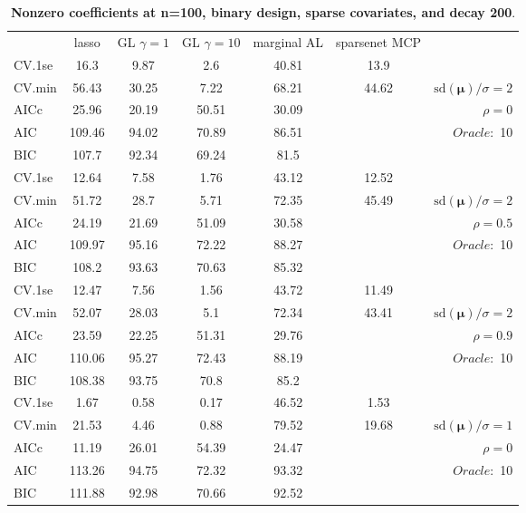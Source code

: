 \clearpage
\begin{table}\vspace{-.5cm}
\caption[l]{ { \bf Nonzero coefficients at n=100, binary design, 
sparse covariates, and  decay  200}.}
\vspace{-.5cm}
\footnotesize{}
\begin{center}
\begin{tabular}{l*{5}{c}|r}
& lasso & GL $\gamma=1$ & GL $\gamma=10$ & marginal AL & sparsenet MCP  & \\
 \cline{1-7}
CV.1se & 16.3 & 9.87 & 2.6 & 40.81 & 13.9 & \\
CV.min & 56.43 & 30.25 & 7.22 & 68.21 & 44.62 &  $\mathrm{sd}(\mathbf{\mu})/\sigma=2$ \\
AICc & 25.96 & 20.19 & 50.51 & 30.09 & & $\rho=0$ \\
AIC & 109.46 & 94.02 & 70.89 & 86.51 & &  \multirow{2}{*}{$Oracle: $ 10} \\
BIC & 107.7 & 92.34 & 69.24 & 81.5 & &  \\
 \hline 
CV.1se & 12.64 & 7.58 & 1.76 & 43.12 & 12.52 & \\
CV.min & 51.72 & 28.7 & 5.71 & 72.35 & 45.49 &  $\mathrm{sd}(\mathbf{\mu})/\sigma=2$ \\
AICc & 24.19 & 21.69 & 51.09 & 30.58 & & $\rho=0.5$ \\
AIC & 109.97 & 95.16 & 72.22 & 88.27 & &  \multirow{2}{*}{$Oracle: $ 10} \\
BIC & 108.2 & 93.63 & 70.63 & 85.32 & &  \\
 \hline 
CV.1se & 12.47 & 7.56 & 1.56 & 43.72 & 11.49 & \\
CV.min & 52.07 & 28.03 & 5.1 & 72.34 & 43.41 &  $\mathrm{sd}(\mathbf{\mu})/\sigma=2$ \\
AICc & 23.59 & 22.25 & 51.31 & 29.76 & & $\rho=0.9$ \\
AIC & 110.06 & 95.27 & 72.43 & 88.19 & &  \multirow{2}{*}{$Oracle: $ 10} \\
BIC & 108.38 & 93.75 & 70.8 & 85.2 & &  \\
 \hline 
CV.1se & 1.67 & 0.58 & 0.17 & 46.52 & 1.53 & \\
CV.min & 21.53 & 4.46 & 0.88 & 79.52 & 19.68 &  $\mathrm{sd}(\mathbf{\mu})/\sigma=1$ \\
AICc & 11.19 & 26.01 & 54.39 & 24.47 & & $\rho=0$ \\
AIC & 113.26 & 94.75 & 72.32 & 93.32 & &  \multirow{2}{*}{$Oracle: $ 10} \\
BIC & 111.88 & 92.98 & 70.66 & 92.52 & &  \\

\end{tabular}
\end{center}
\end{table}
